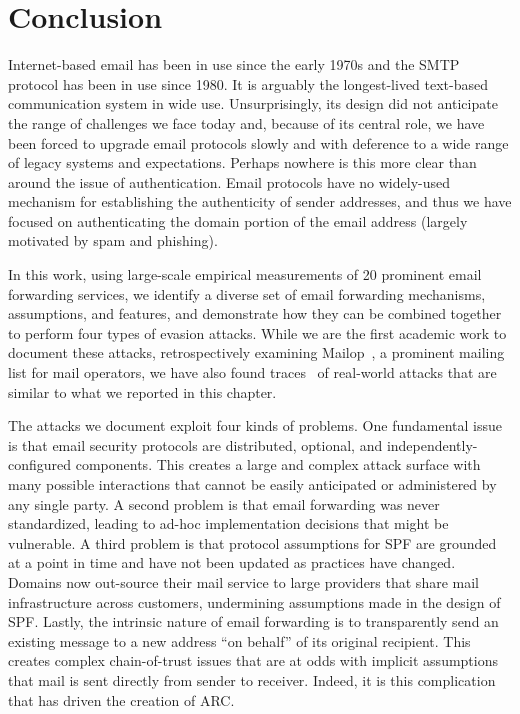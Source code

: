 \section{Conclusion}
\label{sec:discussion}
Internet-based email has been in use since the early 1970s
and the SMTP protocol has been in use since 1980.  It is arguably the
longest-lived text-based communication system in wide use.
Unsurprisingly, its design did not anticipate the range of challenges
we face today and, because of its central role, we have been forced
to upgrade email protocols slowly and with deference to a wide range
of legacy systems and expectations. Perhaps nowhere is this more clear
than around the issue of authentication.  Email protocols have no
widely-used mechanism for establishing the authenticity of sender
addresses, and thus we have focused on authenticating the domain
portion of the email address (largely motivated by spam and phishing).

In this work, using large-scale empirical measurements of 20 prominent email forwarding services, we identify a diverse set of email forwarding mechanisms, assumptions, and features, and demonstrate how they can be combined together to perform four types of evasion attacks. While we are the first academic work to document these attacks, retrospectively examining Mailop~\cite{Mailop96:online}, a prominent mailing list for mail operators, we have also found traces~\cite{RealTraces} of real-world attacks that are similar to what we reported in this chapter. 

The attacks we document exploit four kinds of problems. One fundamental issue is that email security protocols are
distributed, optional, and independently-configured components. This creates a large and complex attack surface with many
possible interactions that cannot be easily anticipated or
administered by any single party. A second problem is that email forwarding was never standardized, leading to ad-hoc implementation decisions that might be vulnerable. A third problem is that protocol assumptions for SPF are grounded at a
point in time and have not been updated as practices have changed. Domains now out-source their mail service to large providers that share mail infrastructure across customers, undermining assumptions made in the design of SPF. Lastly, the intrinsic nature of email forwarding is to transparently send an existing message to a new address ``on behalf'' of its original recipient. 
This creates complex chain-of-trust issues that are at odds with implicit assumptions that mail is sent directly from sender to receiver. Indeed, it is this complication that has driven the creation of ARC.


